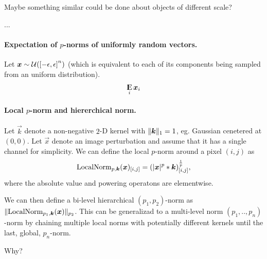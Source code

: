 \documentclass{article}
\begin{document}
Maybe something similar could be done about objects of different scale?

...
\paragraph{Expectation of $p$-norms of uniformly random vectors.}
Let $\vec x \sim\mathcal{U}\del{\intcc{-\epsilon,\epsilon}^n}$ (which is equivalent to each of its components being sampled from an uniform distribution).
\begin{align}
    \E_i \vec x_i
\end{align}

\paragraph{Local $p$-norm and hiererchical norm.}
Let $\vec k$ denote a non-negative $2$-D kernel with $\enVert{\vec k}_1=1$, eg. Gaussian cenetered at $(0,0)$. Let $\vec x$ denote an image perturbation and assume that it has a single channel for simplicity.
We can define the local $p$-norm around a pixel $(i, j)$ as
\begin{align}
    \mathrm{LocalNorm}_{p,\vec k}(\vec x)_\ind{i,j} = \del{\envert{\vec x}^p * \vec k}_\ind{i,j}^\frac{1}{p},
\end{align}
where the absolute value and powering operatons are elementwise.

We can then define a bi-level hierarchical $(p_1,p_2)$-norm as $\enVert{\mathrm{LocalNorm}_{p_1,\vec k}(\vec x)}_{p_2}$. This can be generalizad to a multi-level norm $(p_1,..,p_n)$-norm by chaining multiple local norms with potentially different kernels until the last, global, $p_n$-norm.

Why?



\end{document}
